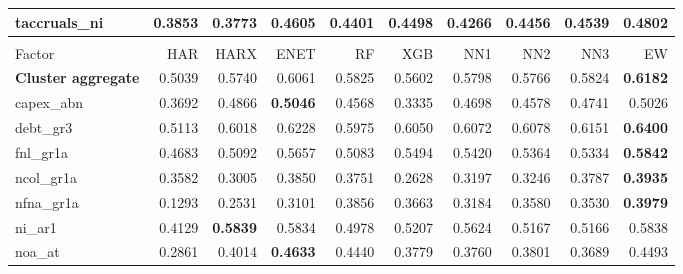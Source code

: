 \begin{longtable}{>{\raggedright\arraybackslash}p{2.6cm}rrrrrrrrr}
taccruals\_ni & 0.3853 & 0.3773 & \cellcolor{blue!10}0.4605 & \cellcolor{blue!10}0.4401 & \cellcolor{blue!10}0.4498 & \cellcolor{blue!10}0.4266 & \cellcolor{blue!10}0.4456 & \cellcolor{blue!10}0.4539 & \textbf{\cellcolor{blue!10}0.4802} \\
\hline
\multicolumn{10}{@{}l}{\textit{Panel B. Debt Issuance}} \\
\hline
Factor & HAR & HARX & ENET & RF & XGB & NN1 & NN2 & NN3 & EW \\
\hline
\textbf{Cluster aggregate} & 0.5039 & \cellcolor{blue!10}0.5740 & \cellcolor{blue!10}0.6061 & \cellcolor{blue!10}0.5825 & \cellcolor{blue!10}0.5602 & \cellcolor{blue!10}0.5798 & \cellcolor{blue!10}0.5766 & \cellcolor{blue!10}0.5824 & \textbf{\cellcolor{blue!10}0.6182} \\
capex\_abn & 0.3692 & \cellcolor{blue!10}0.4866 & \textbf{\cellcolor{blue!10}0.5046} & \cellcolor{blue!10}0.4568 & 0.3335 & \cellcolor{blue!10}0.4698 & \cellcolor{blue!10}0.4578 & \cellcolor{blue!10}0.4741 & \cellcolor{blue!10}0.5026 \\
debt\_gr3 & 0.5113 & \cellcolor{blue!10}0.6018 & \cellcolor{blue!10}0.6228 & \cellcolor{blue!10}0.5975 & \cellcolor{blue!10}0.6050 & \cellcolor{blue!10}0.6072 & \cellcolor{blue!10}0.6078 & \cellcolor{blue!10}0.6151 & \textbf{\cellcolor{blue!10}0.6400} \\
fnl\_gr1a & 0.4683 & \cellcolor{blue!10}0.5092 & \cellcolor{blue!10}0.5657 & \cellcolor{blue!10}0.5083 & \cellcolor{blue!10}0.5494 & \cellcolor{blue!10}0.5420 & \cellcolor{blue!10}0.5364 & \cellcolor{blue!10}0.5334 & \textbf{\cellcolor{blue!10}0.5842} \\
ncol\_gr1a & 0.3582 & 0.3005 & \cellcolor{blue!10}0.3850 & \cellcolor{blue!10}0.3751 & 0.2628 & 0.3197 & 0.3246 & \cellcolor{blue!10}0.3787 & \textbf{\cellcolor{blue!10}0.3935} \\
nfna\_gr1a & 0.1293 & \cellcolor{blue!10}0.2531 & \cellcolor{blue!10}0.3101 & \cellcolor{blue!10}0.3856 & \cellcolor{blue!10}0.3663 & \cellcolor{blue!10}0.3184 & \cellcolor{blue!10}0.3580 & \cellcolor{blue!10}0.3530 & \textbf{\cellcolor{blue!10}0.3979} \\
ni\_ar1 & 0.4129 & \textbf{\cellcolor{blue!10}0.5839} & \cellcolor{blue!10}0.5834 & \cellcolor{blue!10}0.4978 & \cellcolor{blue!10}0.5207 & \cellcolor{blue!10}0.5624 & \cellcolor{blue!10}0.5167 & \cellcolor{blue!10}0.5166 & \cellcolor{blue!10}0.5838 \\
noa\_at & 0.2861 & \cellcolor{blue!10}0.4014 & \textbf{\cellcolor{blue!10}0.4633} & \cellcolor{blue!10}0.4440 & \cellcolor{blue!10}0.3779 & \cellcolor{blue!10}0.3760 & \cellcolor{blue!10}0.3801 & \cellcolor{blue!10}0.3689 & \cellcolor{blue!10}0.4493 \\

\end{longtable}
